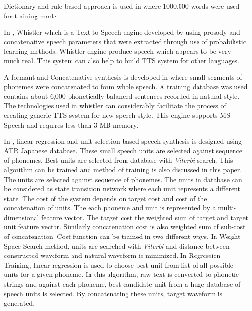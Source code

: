 Dictionary and rule based approach is used in \cite{liberman1992text} where 1000,000 words were used for training model. 


In \cite{huang1996whistler}, Whistler which is a Text-to-Speech engine developed by using prosody and
concatenative speech parameters that were extracted through use of probabilistic learning methods. Whistler engine produce
speech which appears to be very much real. This system can also help to build TTS system for other languages.


A formant and Concatenative synthesis is developed in \cite{huang1997recent}
where small segments of phonemes were concatenated to form whole speech. A training database was used contains about 6,000 phonetically balanced sentences recorded in natural style. The technologies used in whistler can considerably facilitate the
process of creating generic TTS system for new speech style. This engine supports MS Speech and requires less than 3 MB memory.

In \cite{hunt1996unit}, linear regression and unit selection 
based speech synthesis is designed using ATR Japanese database. These small speech units are selected against sequence of phonemes. Best
units are selected from database with \textit{Viterbi} search. This algorithm can be trained and method of training is also discussed in
this paper. The units are selected against sequence of phonemes. The units in database can be considered as state transition network where each unit represents a different state. The cost of the system depends on target cost and cost of the concatenation of units. The each phoneme and unit is
represented by a multi-dimensional feature vector. The target cost the weighted sum of target and target unit feature vector.
Similarly concatenation cost is also weighted sum of sub-cost of concatenation. Cost function can be trained in two different
ways. In Weight Space Search method, units are searched with \textit{Viterbi} and distance between constructed waveform and
natural waveform is minimized. In Regression Training, linear regression is used to choose best unit from list of all possible
units for a given phoneme. In this algorithm, raw text is converted to phonetic strings and against each phoneme, best candidate unit from a huge database of
speech units is selected. By concatenating these units, target waveform is generated.


